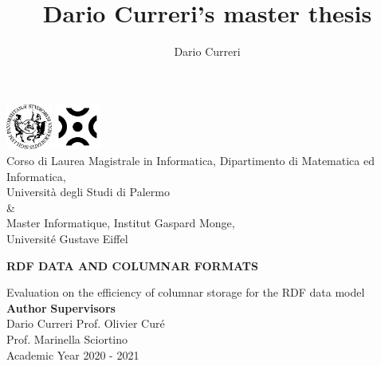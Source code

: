 \documentclass[10pt, a4paper]{report}
\author{Dario Curreri}
\title{Dario Curreri's master thesis}
\begin{document}

\begin{titlepage}
	\begin{center}
		\begin{large}
			\includegraphics[height=1.5cm]{./assets/img/unipa_logo.png}
			\hspace{1.5cm}
			\includegraphics[height=1.5cm]{./assets/img/uge_logo.png}\\
			\vspace{1cm}
			Corso di Laurea Magistrale in Informatica, Dipartimento di Matematica ed Informatica,\\
			Università degli Studi di Palermo\\
			\vspace{0.15cm}
			\&\\
			\vspace{0.15cm}
			Master Informatique, Institut Gaspard Monge,\\
			Université Gustave Eiffel\\
			\vspace{2.5cm}
			\begin{LARGE}
				\textbf{RDF DATA AND COLUMNAR FORMATS}\\
			\end{LARGE}
			\vspace{0.3cm}
			Evaluation on the efficiency of columnar storage for the RDF data model\\
			\vfill
			\textbf{Author} \hfill \textbf{Supervisors}\\
			Dario Curreri \hfill Prof. Olivier Curé\\
			\hfill  Prof. Marinella Sciortino\\
			\vspace{2cm}
			Academic Year \hspace{0.3cm} 2020 - 2021
		\end{large}
	\end{center}
\end{titlepage}
\restoregeometry
\clearpage
\end{document}
